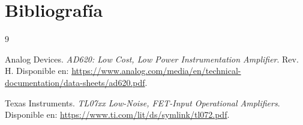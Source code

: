 \documentclass[10pt]{article}
\begin{document}
\section{Bibliografía}

\begingroup
\renewcommand{\section}[2]{}
\begin{thebibliography}{9}

    Analog Devices.
    \textit{AD620: Low Cost, Low Power Instrumentation Amplifier}.
    Rev. H. Disponible en:
    \url{https://www.analog.com/media/en/technical-documentation/data-sheets/ad620.pdf}.

    Texas Instruments.
    \textit{TL07xx Low-Noise, FET-Input Operational Amplifiers}.
    Disponible en:
    \url{https://www.ti.com/lit/ds/symlink/tl072.pdf}.

\end{thebibliography}
\endgroup
\end{document}
